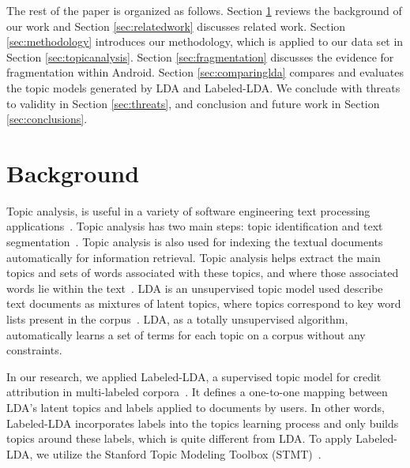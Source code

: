 \documentclass[10pt, conference, compsocconf]{IEEEtran}
\begin{document}
The rest of the paper is organized as follows. Section \ref{sec:background} reviews the
background of our work and Section \ref{sec:relatedwork} discusses related work. Section \ref{sec:methodology}
introduces our methodology, which is applied to our data set in
Section \ref{sec:topicanalysis}. Section \ref{sec:fragmentation}
discusses the evidence for fragmentation within Android. Section \ref{sec:comparinglda} compares and evaluates the topic models generated
by LDA and Labeled-LDA. 
We conclude with threats to validity in Section \ref{sec:threats},
and conclusion and future work in
Section \ref{sec:conclusions}.


\section{Background}
\label{sec:background}


Topic analysis,  is useful in a variety of software engineering text
processing applications~\cite{hindle9s}. 
Topic analysis has two main steps: topic identification and text
segmentation~\cite{li2003topic}. Topic analysis is also used for
indexing the textual documents automatically for information retrieval. %
Topic analysis helps extract the main topics and sets of 
words associated with these topics, and where those associated words lie within
the text~\cite{li2003topic}. 
LDA is an unsupervised topic model used describe text documents as
mixtures of latent topics, where topics correspond to key word lists
present in the corpus~\cite{ldawiki}.
LDA, as a totally unsupervised algorithm, automatically learns a set
of terms for each topic on a corpus without any constraints. 


In our research, we applied Labeled-LDA, 
a supervised topic model for credit
attribution in multi-labeled corpora~\cite{labeledlda}. It defines a
one-to-one mapping between LDA's latent topics and labels applied to
documents by 
users. In other words, Labeled-LDA incorporates labels into
the topics learning process and only builds topics around these labels,
which is quite different from LDA. 
To apply Labeled-LDA, we utilize the Stanford Topic Modeling Toolbox (STMT)~\cite{stmt}. 

\end{document}
